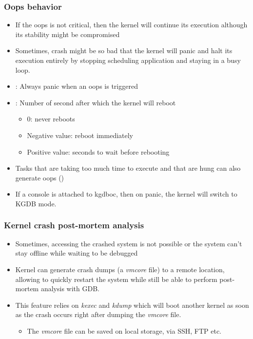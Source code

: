 \begin{frame}
  \frametitle{Oops behavior}
  \begin{itemize}
    \item If the oops is not critical, then the kernel will continue its
          execution although its stability might be compromised
    \item Sometimes, crash might be so bad that the kernel will panic and halt
          its execution entirely by stopping scheduling application and staying
          in a busy loop.
    \item {}: Always panic when an oops is
          triggered
    \item {}: Number of second after which the
          kernel will reboot
    \begin{itemize}
      \item 0: never reboots
      \item Negative value: reboot immediately
      \item Positive value: seconds to wait before rebooting
    \end{itemize}
    \item Tasks that are taking too much time to execute and that are hung can
          also generate oops ()
    \item If a console is attached to kgdboc, then on panic, the kernel will
          switch to KGDB mode.
  \end{itemize}
\end{frame}

\begin{frame}
  \frametitle{Kernel crash post-mortem analysis}
  \begin{itemize}
    \item Sometimes, accessing the crashed system is not possible or the system
          can't stay offline while waiting to be debugged
    \item Kernel can generate crash dumps (a {\em vmcore} file) to a remote
          location, allowing to quickly restart the system while still
          be able to perform post-mortem analysis with GDB.
    \item This feature relies on {\em kexec} and {\em kdump} which will
          boot another kernel as soon as the crash occurs right after dumping the
          {\em vmcore} file.
    \begin{itemize}
      \item The {\em vmcore} file can be saved on local storage, via SSH, FTP etc.
    \end{itemize}
  \end{itemize}
\end{frame}


